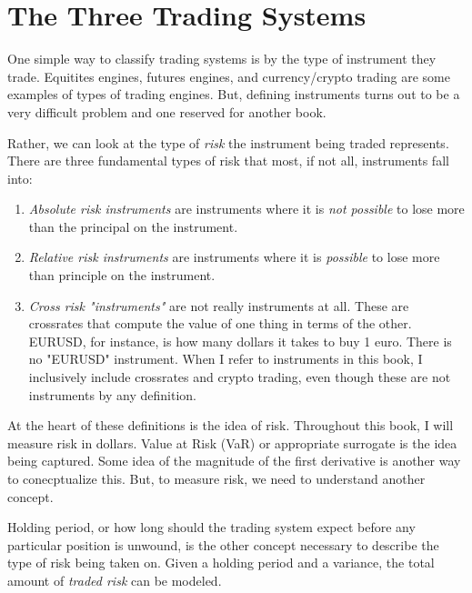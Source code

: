\chapter{The Three Trading Systems}

One simple way to classify trading systems is by the type of instrument they trade.
Equitites engines, futures engines, and currency/crypto trading are some examples of
types of trading engines.  But, defining instruments turns out to be a very difficult
problem and one reserved for another book.

Rather, we can look at the type of \emph{risk} the instrument being traded
represents.  There are three fundamental types of risk that most, if not all,
instruments fall into:
\begin{enumerate}
\item \emph{Absolute risk instruments} are instruments where it is \emph{not
possible} to lose more than the principal on the instrument.
\item \emph{Relative risk instruments} are instruments where it is \emph{possible}
to lose more than principle on the instrument.
\item \emph{Cross risk "instruments"} are not really instruments at all.  These
are crossrates that compute the value of one thing in terms of the other.  EURUSD,
for instance, is how many dollars it takes to buy 1 euro. There is no "EURUSD"
instrument. When I refer to instruments in this book, I inclusively include crossrates
and crypto trading, even though these are not instruments by any definition.
\end{enumerate}
At the heart of these definitions is the idea of risk. Throughout this book, I will
measure risk in dollars.  Value at Risk (VaR) or appropriate surrogate is the idea
being captured.  Some idea of the magnitude of the first derivative is another way
to conecptualize this. But, to measure risk, we need to understand another concept.

Holding period, or how long should the trading system expect before any particular
position is unwound, is the other concept necessary to describe the type of risk
being taken on.  Given a holding period and a variance, the total amount of
\emph{traded risk} can be modeled.


